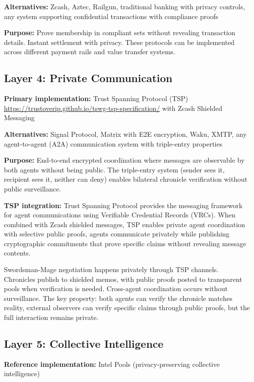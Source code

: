 \documentclass[11pt,a4paper]{article}
\theoremstyle{definition}
\begin{document}
\textbf{Alternatives:} Zcash, Aztec, Railgun, traditional banking with privacy controls, any system supporting confidential transactions with compliance proofs

\textbf{Purpose:} Prove membership in compliant sets without revealing transaction details. Instant settlement with privacy. These protocols can be implemented across different payment rails and value transfer systems.

\subsection{Layer 4: Private Communication}

\textbf{Primary implementation:} Trust Spanning Protocol (TSP) \url{https://trustoverip.github.io/tswg-tsp-specification/} with Zcash Shielded Messaging

\textbf{Alternatives:} Signal Protocol, Matrix with E2E encryption, Waku, XMTP, any agent-to-agent (A2A) communication system with triple-entry properties

\textbf{Purpose:} End-to-end encrypted coordination where messages are observable by both agents without being public. The triple-entry system (sender sees it, recipient sees it, neither can deny) enables bilateral chronicle verification without public surveillance.

\textbf{TSP integration:} Trust Spanning Protocol provides the messaging framework for agent communications using Verifiable Credential Records (VRCs). When combined with Zcash shielded messages, TSP enables private agent coordination with selective public proofs, agents communicate privately while publishing cryptographic commitments that prove specific claims without revealing message contents.

Swordsman-Mage negotiation happens privately through TSP channels. Chronicles publish to shielded memos, with public proofs posted to transparent pools when verification is needed. Cross-agent coordination occurs without surveillance. The key property: both agents can verify the chronicle matches reality, external observers can verify specific claims through public proofs, but the full interaction remains private.

\subsection{Layer 5: Collective Intelligence}

\textbf{Reference implementation:} Intel Pools (privacy-preserving collective intelligence)
\end{document}
